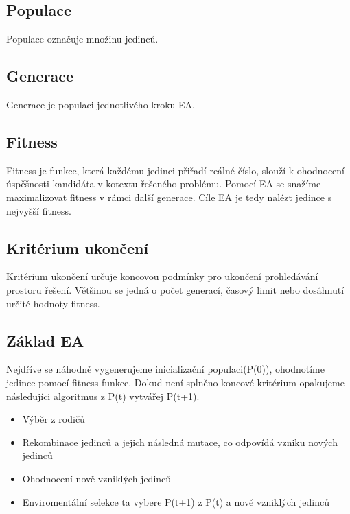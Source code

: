 \subsection{Populace}
Populace označuje množinu jedinců.
\subsection{Generace}
Generace je populaci jednotlivého kroku EA.
\subsection{Fitness}
Fitness je funkce, která každému jedinci přiřadí reálné číslo, slouží k ohodnocení úspěšnosti kandidáta v kotextu řešeného problému. Pomocí EA se snažíme maximalizovat fitness v rámci další generace. Cíle EA je tedy nalézt jedince s nejvyšší fitness. 
\subsection{Kritérium ukončení}
Kritérium ukončení určuje koncovou podmínky pro ukončení prohledávání prostoru řešení. Většinou se jedná o počet generací, časový limit nebo dosáhnutí určité hodnoty fitness.  
\subsection{Základ EA}
Nejdříve se náhodně vygenerujeme inicializační populaci(P(0)), ohodnotíme jedince pomocí fitness funkce. Dokud není splněno koncové kritérium opakujeme následujíci algoritmus z P(t) vytvářej P(t+1). 
\begin{itemize}
    \item Výběr z rodičů 
    \item Rekombinace jedinců a jejich následná mutace, co odpovídá vzniku nových jedinců
    \item Ohodnocení nově vzniklých jedinců
    \item Enviromentální selekce ta vybere P(t+1) z P(t) a nově vzniklých jedinců
\end{itemize}
